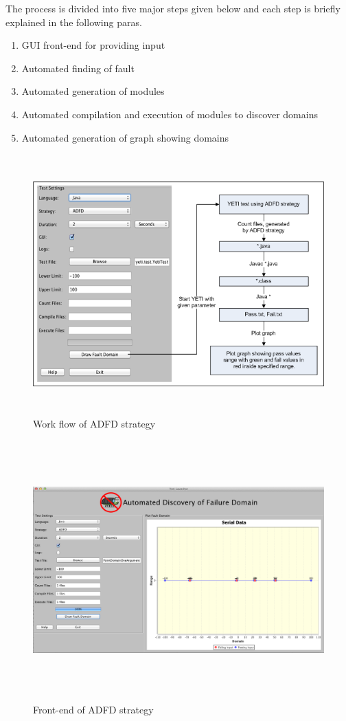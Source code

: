 The process is divided into five major steps given below and each step is briefly explained in the following paras.

\begin{enumerate}
\item GUI front-end for providing input
\item Automated finding of fault
\item Automated generation of modules
\item Automated compilation and execution of modules to discover domains
\item Automated generation of graph showing domains
\end{enumerate}

\begin{figure}[ht]
\centering
\includegraphics[width=15cm,height=10cm]{chapter5/ADFD_Diagram1.png}
\caption{Work flow of ADFD strategy}
\label{fig:ADFD-workflow}
\end{figure}

\begin{figure}[htp]
\begin{center}
\includegraphics[width=15cm,height=10cm]{chapter5/ADFD_front_end.png}
\caption{Front-end of ADFD strategy}
\label{fig:ADFD-frontend}
\end{center}
\end{figure}

